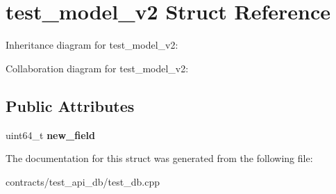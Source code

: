 \hypertarget{structtest__model__v2}{}\section{test\+\_\+model\+\_\+v2 Struct Reference}
\label{structtest__model__v2}


Inheritance diagram for test\+\_\+model\+\_\+v2\+:


Collaboration diagram for test\+\_\+model\+\_\+v2\+:
\subsection*{Public Attributes}
\begin{DoxyCompactItemize}
\item 
\mbox{\label{structtest__model__v2_afa9a1094a307b828aa1de71e8e1441e8}} 
uint64\+\_\+t {\bfseries new\+\_\+field}
\end{DoxyCompactItemize}


The documentation for this struct was generated from the following file\+:\begin{DoxyCompactItemize}
\item 
contracts/test\+\_\+api\+\_\+db/test\+\_\+db.\+cpp\end{DoxyCompactItemize}
